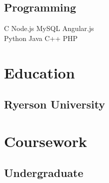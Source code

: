 \documentclass[letterpaper]{deedy-resume}
\begin{document}
\begin{center}
\begin{minipage}[t]{0.29\textwidth}

\sectionspace
\subsection{Programming}
\sectionspace
C \thinspace \textbullet{} Node.js \textbullet{} MySQL \textbullet{} Angular.js \\ Python  \thinspace \textbullet{}Java \textbullet{}   C++ \textbullet{}PHP 
\sectionspace


\section{Education} 
\sectionspace
\subsection{Ryerson University}

\section{Coursework}
\sectionspace
\subsection{Undergraduate}
\sectionspace


\end{minipage}
\end{center}
\end{document}
